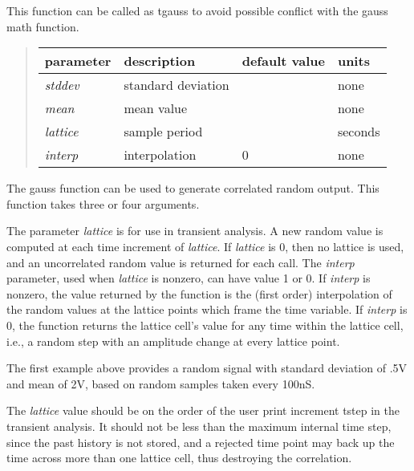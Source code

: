 

This function can be called as {\vt tgauss} to avoid possible conflict
with the {\vt gauss} math function.

\begin{quote}
\begin{tabular}{|l|l|l|l|} \hline
{\bf parameter} & {\bf description} & {\bf default value} &
 {\bf units}\\ \hline\hline
{\it stddev\/} & standard deviation &  & none\\ \hline
{\it mean\/} & mean value &  & none\\ \hline
{\it lattice\/} & sample period &  & seconds\\ \hline
{\it interp\/} & interpolation & 0 & none\\ \hline
\end{tabular}
\end{quote}

The {\vt gauss} function can be used to generate correlated random
output.  This function takes three or four arguments.

The parameter {\it lattice} is for use in transient analysis.  A new
random value is computed at each time increment of {\it lattice}.  If
{\it lattice} is 0, then no lattice is used, and an uncorrelated
random value is returned for each call.  The {\it interp} parameter,
used when {\it lattice} is nonzero, can have value 1 or 0.  If {\it
interp} is nonzero, the value returned by the function is the (first
order) interpolation of the random values at the lattice points which
frame the time variable.  If {\it interp} is 0, the function returns
the lattice cell's value for any time within the lattice cell, i.e., a
random step with an amplitude change at every lattice point.

The first example above provides a random signal with standard
deviation of .5V and mean of 2V, based on random samples taken every
100nS.

The {\it lattice} value should be on the order of the user print
increment {\vt tstep} in the transient analysis.  It should not be
less than the maximum internal time step, since the past history is
not stored, and a rejected time point may back up the time across more
than one lattice cell, thus destroying the correlation.

